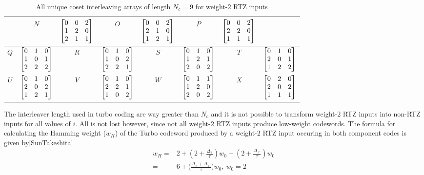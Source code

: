\documentclass[11pt, oneside, dvipdfmx]{book}
\begin{document}
\begin{table}[h!]
\begin{tabular}{|c || c | c|| c|c || c | c|| c|}
 &
  $N$ & $\begin{bmatrix}0 & 0 & 2 \cr 1 & 2 & 0 \cr 2 & 1 & 1 \end{bmatrix}$ 
 &
 $O$ & $\begin{bmatrix}0 & 0 & 2 \cr 2 & 1 & 0 \cr 1 & 2 & 1\end{bmatrix}$ 
&
 $P$ & $\begin{bmatrix}0 & 0 & 2 \cr 2 & 2 & 0 \cr 1 & 1 & 1\end{bmatrix}$\\ 
 \hline
 $Q$ & $\begin{bmatrix}0 & 1 & 0 \cr 1 & 0 & 1 \cr 2 & 2 & 2 \end{bmatrix}$
&
  $R$ & $\begin{bmatrix}0 & 1 & 0 \cr 1 & 0 & 2 \cr 2 & 2 & 1\end{bmatrix}$ 
&
 $S$ & $\begin{bmatrix}0 & 1 & 0 \cr 1 & 2 & 1 \cr 2 & 0 & 2 \end{bmatrix}$
 &
 $T$ & $\begin{bmatrix}0 & 1 & 0 \cr 2 & 0 & 1 \cr 1 & 2 & 2\end{bmatrix}$\\ 
 \hline
 $U$ & $\begin{bmatrix}0 & 1 & 0 \cr 2 & 0 & 2 \cr 1 & 2 & 1\end{bmatrix}$ 
 &
 $V$ & $\begin{bmatrix}0 & 1 & 0 \cr 2 & 2 & 1 \cr 1 & 0 & 2\end{bmatrix}$ 
 &
 $W$ & $\begin{bmatrix}0 & 1 & 1 \cr 1 & 2 & 0 \cr 2 & 0 & 2 \end{bmatrix}$
 &
 $X$ & $\begin{bmatrix}0 & 2 & 0 \cr 2 & 0 & 2 \cr 1 & 1 & 1\end{bmatrix}$\\ 
   \hline

  \end{tabular}
\caption{All unique coset interleaving arrays of length $N_c =9$ for weight-$2$ RTZ inputs}
\label{tb1}
\end{table}

The interleaver length used in turbo coding are way greater than $N_c$ and it is not possible to transform weight-$2$ RTZ inputs into non-RTZ inputs for all values of $i$. All is not lost however, since not all weight-$2$ RTZ inputs produce low-weight codewords. 
The formula for calculating the Hamming weight ($w_H$) of the Turbo codeword produced by a weight-$2$ RTZ input occuring in both component codes is given by[SunTakeshita] 
\begin{equation}
\begin{split}
w_H=&2+(2 + \frac{\Delta_\pi}{\tau} )w_0+ (2 + \frac{\Delta_{\pi'}}{\tau})w_0\\
=&6+\Big(\frac{\Delta_\pi+\Delta_{\pi'}}{\tau}\Big)w_0,~w_0=2
\end{split}
\label{eq3}
\end{equation}
\end{document}
